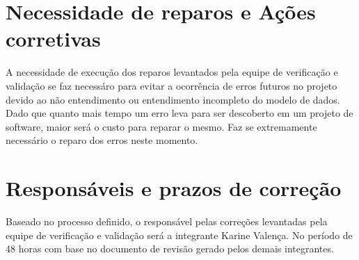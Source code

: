 \section{Necessidade de reparos e Ações corretivas}

A necessidade de execução dos reparos levantados pela equipe de verificação e validação se faz necessáro para evitar
a ocorrência de erros futuros no projeto devido ao não entendimento ou entendimento incompleto do modelo de dados.
Dado que quanto mais tempo um erro leva para ser descoberto em um projeto de software, maior será o custo para reparar o mesmo.
Faz se extremamente necessário o reparo dos erros neste momento.

\section{Responsáveis e prazos de correção}

Baseado no processo definido, o responsável pelas correções levantadas pela equipe de verificação e validação será a integrante Karine
Valença. No período de 48 horas com base no documento de revisão gerado pelos demais integrantes.
